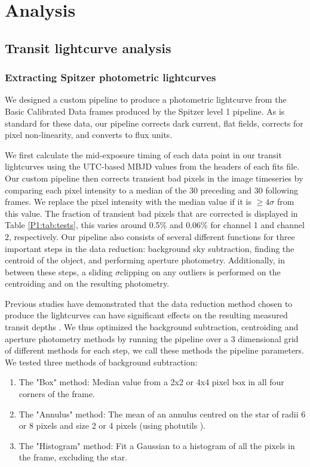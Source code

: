 \section{Analysis}
\label{P1:sec:Analysis}

\subsection{Transit lightcurve analysis}

\subsubsection{Extracting Spitzer photometric lightcurves}
\label{P1:subsec:photometry}

We designed a custom pipeline to produce a photometric lightcurve from the Basic Calibrated Data frames produced by the Spitzer level 1 pipeline. As is standard for these data, our pipeline corrects dark current, flat fields, corrects for pixel non-linearity, and converts to flux units.

We first calculate the mid-exposure timing of each data point in our transit lightcurves using the UTC-based MBJD values from the headers of each fits file. Our custom pipeline then corrects transient bad pixels in the image timeseries by comparing each pixel intensity to a median of the 30 preceding and 30 following frames. We replace the pixel intensity with the median value if it is $\geq4\sigma$ from this value. The fraction of transient bad pixels that are corrected is displayed in Table \ref{P1:tab:tests}, this varies around 0.5\% and 0.06\% for channel 1 and channel 2, respectively. Our pipeline also consists of several different functions for three important steps in the data reduction: background sky subtraction, finding the centroid of the object, and performing aperture photometry. Additionally, in between these steps, a sliding $\sigma$clipping on any outliers is performed on the centroiding and on the resulting photometry.

Previous studies have demonstrated that the data reduction method chosen to produce the lightcurves can have significant effects on the resulting measured transit depths \citep{Ingalls2016}. We thus optimized the background subtraction, centroiding and aperture photometry methods by running the pipeline over a 3 dimensional grid of different methods for each step, we call these methods the pipeline parameters. We tested three methods of background subtraction:
\begin{enumerate}
    \item The "Box" method: Median value from a 2x2 or 4x4 pixel box in all four corners of the frame.
    \item The "Annulus" method: The mean of an annulus centred on the star of radii 6 or 8 pixels and size 2 or 4 pixels (using photutils \cite{}).
    \item The "Histogram" method: Fit a Gaussian to a histogram of all the pixels in the frame, excluding the star.
\end{enumerate}

